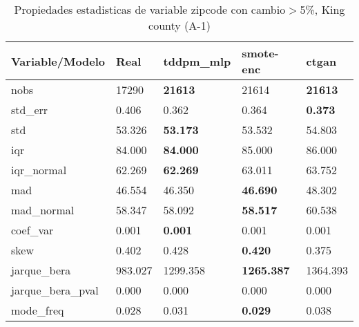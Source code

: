 \begin{table}[H]
\centering
\fontsize{8}{14}\selectfont
\caption{Propiedades estadisticas de variable zipcode con cambio\ensuremath{>}5\%, King county (A-1)}
\label{table-stats-king county-a-1-zipcode-short}
\begin{tabular}{|l|m{10em}|m{10em}|m{10em}|m{10em}|}
\hline
 \rowcolor[gray]{0.8}
Variable/Modelo & Real & tddpm\_mlp & smote-enc & ctgan \\
\hline nobs & 17290 & \bfseries 21613 & \cellcolor[rgb]{0.9, 0.54, 0.52} 21614 & \bfseries 21613 \\
\hline std\_err & 0.406 & \cellcolor[rgb]{0.9, 0.54, 0.52} 0.362 & 0.364 & \bfseries 0.373 \\
\hline std & 53.326 & \bfseries 53.173 & 53.532 & \cellcolor[rgb]{0.9, 0.54, 0.52} 54.803 \\
\hline iqr & 84.000 & \bfseries 84.000 & 85.000 & \cellcolor[rgb]{0.9, 0.54, 0.52} 86.000 \\
\hline iqr\_normal & 62.269 & \bfseries 62.269 & 63.011 & \cellcolor[rgb]{0.9, 0.54, 0.52} 63.752 \\
\hline mad & 46.554 & 46.350 & \bfseries 46.690 & \cellcolor[rgb]{0.9, 0.54, 0.52} 48.302 \\
\hline mad\_normal & 58.347 & 58.092 & \bfseries 58.517 & \cellcolor[rgb]{0.9, 0.54, 0.52} 60.538 \\
\hline coef\_var & 0.001 & \bfseries 0.001 & 0.001 & \cellcolor[rgb]{0.9, 0.54, 0.52} 0.001 \\
\hline skew & 0.402 & 0.428 & \bfseries 0.420 & \cellcolor[rgb]{0.9, 0.54, 0.52} 0.375 \\
\hline jarque\_bera & 983.027 & 1299.358 & \bfseries 1265.387 & \cellcolor[rgb]{0.9, 0.54, 0.52} 1364.393 \\
\hline jarque\_bera\_pval & 0.000 & 0.000 & 0.000 & 0.000 \\
\hline mode\_freq & 0.028 & 0.031 & \bfseries 0.029 & \cellcolor[rgb]{0.9, 0.54, 0.52} 0.038 \\
\hline
\end{tabular}
\end{table}
